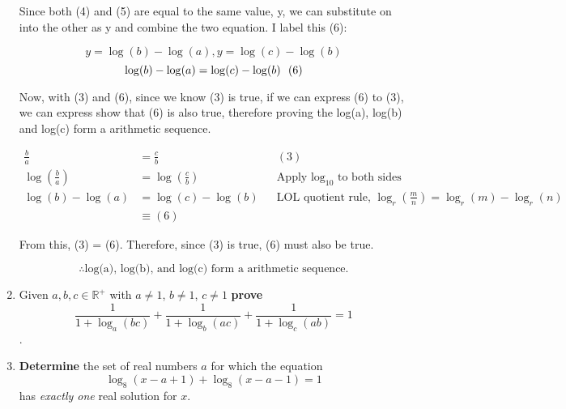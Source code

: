 \documentclass[12pt]{book}
\begin{document}
\begin{enumerate}
Since both (4) and (5) are equal to the same value, y, we can 
substitute on into the other as y and combine the two equation. 
I label this (6):

$$y = \log(b) - \log(a), y = \log(c) - \log(b)$$
$$\log(b) - \log(a) = \log(c) - \log(b) \text{\space \space (6)}$$

\newpage

Now, with (3) and (6), since we know (3) is true, if we can express (6) to (3), 
we can express show that (6) is also true, therefore proving the log(a), log(b) and log(c) 
form a arithmetic sequence.

\begin{align*}
    \frac{b}{a} &= \frac{c}{b} && (3) \\
    \log\left( \frac{b}{a} \right) &= \log\left( \frac{c}{b} \right) && \text{Apply } \log_10 \text{ to both sides} \\
    \log(b) - \log(a) &= \log(c) - \log(b) && \text{LOL quotient rule, } \log_r\left( \frac{m}{n} \right) = \log_r(m) - \log_r(n) \\
    & \equiv (6)
\end{align*}

From this, (3) = (6). Therefore, since (3) is true, (6) must also be true.

$$\boxed{\therefore \text{log(a), log(b), and log(c) form a arithmetic sequence.}}$$

\newpage


\item Given $a,b,c \in \mathbb{R^+}$ with $a\neq1$, $b\neq1$, $c\neq1$ \textbf{prove} $$\dfrac{1}{1+\log_a(bc)} + \dfrac{1}{1+\log_b(ac)} + \dfrac{1}{1+\log_c(ab)} = 1$$.


\newpage

\item \textbf{Determine} the set of real numbers $a$ for which the equation $$\log_8(x-a+1) + \log_8(x-a-1) =1$$ has \emph{exactly one} real solution for $x$.



\newpage


\end{enumerate}
\end{document}
